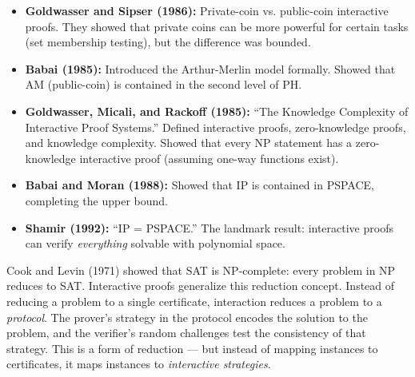 \begin{itemize}
\item \textbf{Goldwasser and Sipser (1986):} Private-coin vs. public-coin interactive proofs. They showed that private coins can be more powerful for certain tasks (set membership testing), but the difference was bounded.

\item \textbf{Babai (1985):} Introduced the Arthur-Merlin model formally. Showed that AM (public-coin) is contained in the second level of PH.

\item \textbf{Goldwasser, Micali, and Rackoff (1985):} ``The Knowledge Complexity of Interactive Proof Systems.'' Defined interactive proofs, zero-knowledge proofs, and knowledge complexity. Showed that every NP statement has a zero-knowledge interactive proof (assuming one-way functions exist).

\item \textbf{Babai and Moran (1988):} Showed that IP is contained in PSPACE, completing the upper bound.

\item \textbf{Shamir (1992):} ``IP = PSPACE.'' The landmark result: interactive proofs can verify \emph{everything} solvable with polynomial space.
\end{itemize}

Cook and Levin (1971) showed that SAT is NP-complete: every problem in NP reduces to SAT. Interactive proofs generalize this reduction concept. Instead of reducing a problem to a single certificate, interaction reduces a problem to a \emph{protocol}. The prover's strategy in the protocol encodes the solution to the problem, and the verifier's random challenges test the consistency of that strategy. This is a form of reduction --- but instead of mapping instances to certificates, it maps instances to \emph{interactive strategies}.

